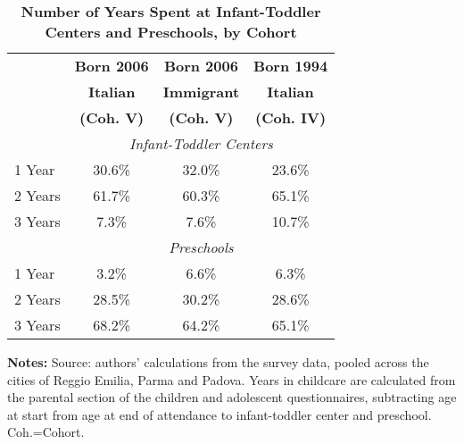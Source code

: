 \begin{table}[ht!]
\caption{\textbf{Number of Years Spent at Infant-Toddler Centers and Preschools, by Cohort}}
\label{tab:Years}
\begin{center}
\footnotesize
\begin{tabular}{ l c c c }
\hline\hline
& \textbf{Born 2006} & \textbf{Born 2006} & \textbf{Born 1994}\\
& \textbf{Italian} & \textbf{Immigrant} & \textbf{Italian}\\
& \textbf{(Coh. V)} & \textbf{(Coh. V)} & \textbf{(Coh. IV)}\\
\hline
&\multicolumn{3}{c}{\textit{Infant-Toddler Centers}}\\
\hline
1 Year      & 30.6\%  & 32.0\%  & 23.6\% \\[0.2em]
2 Years     & 61.7\%  & 60.3\%  & 65.1\% \\[0.2em]
3 Years     & 7.3\%   &  7.6\%  & 10.7\% \\[0.2em]
\hline
&\multicolumn{3}{c}{\textit{Preschools}}\\
\hline
1 Year      &  3.2\%  &  6.6\%  &  6.3\% \\[0.2em]
2 Years     & 28.5\%  & 30.2\%  & 28.6\% \\[0.2em]
3 Years     & 68.2\%  & 64.2\%  & 65.1\% \\[0.2em]
\hline
\end{tabular}
\end{center}
\begin{flushleft}
\tiny{{\bfseries Notes:} Source: authors' calculations from the survey data, pooled across the cities of Reggio Emilia, Parma and Padova. Years in childcare are calculated from the parental section of the children and adolescent questionnaires, subtracting age at start from age at end of attendance to infant-toddler center and preschool. Coh.=Cohort.}
\end{flushleft}
\end{table}

